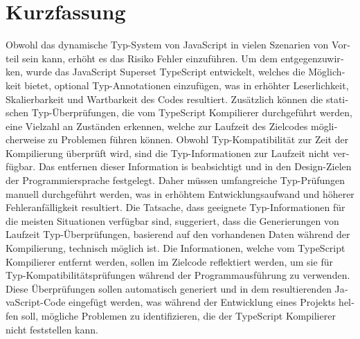 \chapter{Kurzfassung}

\begin{german}
Obwohl das dynamische Typ-System von JavaScript in vielen Szenarien von Vorteil sein kann, erhöht es das Risiko Fehler einzuführen. Um dem entgegenzuwirken, wurde das JavaScript Superset TypeScript entwickelt, welches die Möglichkeit bietet, optional Typ-Annotationen einzufügen, was in erhöhter Leserlichkeit, Skalierbarkeit und Wartbarkeit des Codes resultiert. Zusätzlich können die statischen Typ-Überprüfungen, die vom TypeScript Kompilierer durchgeführt werden, eine Vielzahl an Zuständen erkennen, welche zur Laufzeit des Zielcodes möglicherweise zu Problemen führen können. Obwohl Typ-Kompatibilität zur Zeit der Kompilierung überprüft wird, sind die Typ-Informationen zur Laufzeit nicht verfügbar. Das entfernen dieser Information is beabsichtigt und in den Design-Zielen der Programmiersprache festgelegt. Daher müssen umfangreiche Typ-Prüfungen manuell durchgeführt werden, was in erhöhtem Entwicklungsaufwand und höherer Fehleranfälligkeit resultiert. Die Tatsache, dass geeignete Typ-Informationen für die meisten Situationen verfügbar sind, suggeriert, dass die Generierungen von Laufzeit Typ-Überprüfungen, basierend auf den vorhandenen Daten während der Kompilierung, technisch möglich ist. Die Informationen, welche vom TypeScript Kompilierer entfernt werden, sollen im Zielcode reflektiert werden, um sie für Typ-Kompatibilitätsprüfungen während der Programmausführung zu verwenden. Diese Überprüfungen sollen automatisch generiert und in dem resultierenden JavaScript-Code eingefügt werden, was während der Entwicklung eines Projekts helfen soll, mögliche Problemen zu identifizieren, die der TypeScript Kompilierer nicht feststellen kann.
\end{german}

